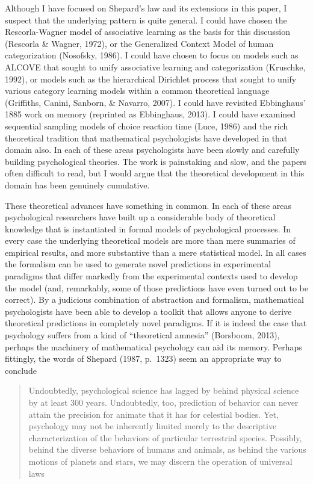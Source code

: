 \documentclass[
  english,
  doc]{apa6}
\begin{document}
Although I have focused on Shepard's law and its extensions in this paper, I suspect that the underlying pattern is quite general. I could have chosen the Rescorla-Wagner model of associative learning as the basis for this discussion (Rescorla \& Wagner, 1972), or the Generalized Context Model of human categorization (Nosofsky, 1986). I could have chosen to focus on models such as ALCOVE that sought to unify associative learning and categorization (Kruschke, 1992), or models such as the hierarchical Dirichlet process that sought to unify various category learning models within a common theoretical language (Griffiths, Canini, Sanborn, \& Navarro, 2007). I could have revisited Ebbinghaus' 1885 work on memory (reprinted as Ebbinghaus, 2013). I could have examined sequential sampling models of choice reaction time (Luce, 1986) and the rich theoretical tradition that mathematical psychologists have developed in that domain also. In each of these areas psychologists have been slowly and carefully building psychological theories. The work is painstaking and slow, and the papers often difficult to read, but I would argue that the theoretical development in this domain has been genuinely cumulative.

These theoretical advances have something in common. In each of these areas psychological researchers have built up a considerable body of theoretical knowledge that is instantiated in formal models of psychological processes. In every case the underlying theoretical models are more than mere summaries of empirical results, and more substantive than a mere statistical model. In all cases the formalism can be used to generate novel predictions in experimental paradigms that differ markedly from the experimental contexts used to develop the model (and, remarkably, some of those predictions have even turned out to be correct). By a judicious combination of abstraction and formalism, mathematical psychologists have been able to develop a toolkit that allows anyone to derive theoretical predictions in completely novel paradigms. If it is indeed the case that psychology suffers from a kind of ``theoretical amnesia'' (Borsboom, 2013), perhaps the machinery of mathematical psychology can aid its memory. Perhaps fittingly, the words of Shepard (1987, p.~1323) seem an appropriate way to conclude

\begin{quote}
Undoubtedly, psychological science has lagged by behind physical science by at least 300 years. Undoubtedly, too, prediction of behavior can never attain the precision for animate that it has for celestial bodies. Yet, psychology may not be inherently limited merely to the descriptive characterization of the behaviors of particular terrestrial species. Possibly, behind the diverse behaviors of humans and animals, as behind the various motions of planets and stars, we may discern the operation of universal laws
\end{quote}
\end{document}
